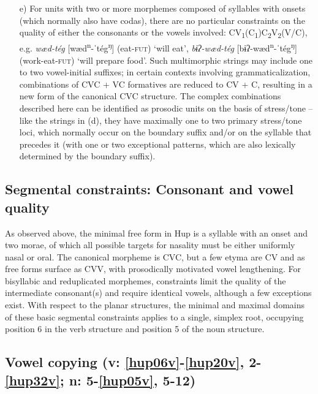 \documentclass[output=paper]{langscibook}
\begin{document}
\begin{enumerate}
    \item[e)] For units with two or more morphemes composed of syllables with onsets (which normally also have codas), there are no particular constraints on the quality of either the consonants or the vowels involved: CV\textsubscript{1}(C\textsubscript{1})C\textsubscript{2}V\textsubscript{2}(V/C), e.g. \textit{wæd-tég} [wæd\textsuperscript{n}{}-ˈtég\textsuperscript{ŋ}] (eat-\textsc{fut)} `will eat', \textit{bɨʔ-wæd-tég} [bɨʔ-wæd\textsuperscript{n}{}-ˈtég\textsuperscript{ŋ}] (work-eat-\textsc{fut}) `will prepare food'. Such multimorphic strings may include one to two vowel-initial suffixes; in certain contexts involving grammaticalization, combinations of CVC + VC formatives are reduced to CV + C, resulting in a new form of the canonical CVC structure. The complex combinations described here can be identified as prosodic units on the basis of stress/tone – like the strings in (d), they have maximally one to two primary stress/tone loci, which normally occur on the boundary suffix and/or on the syllable that precedes it (with one or two exceptional patterns, which are also lexically determined by the boundary suffix).
\end{enumerate}

\subsection{Segmental constraints: Consonant and vowel quality} \label{sec:hup:key:5.2}

As observed above, the minimal free form in Hup is a syllable with an onset and two morae, of which all possible targets for nasality must be either uniformly nasal or oral. The canonical morpheme is CVC, but a few etyma are CV and as free forms surface as CVV, with prosodically motivated vowel lengthening. For bisyllabic and reduplicated morphemes, constraints limit the quality of the intermediate consonant(s) and require identical vowels, although a few exceptions exist. With respect to the planar structures, the minimal and maximal domains of these basic segmental constraints applies to a single, simplex root, occupying position 6 in the verb structure and position 5 of the noun structure.

\subsection{Vowel copying (v: \ref{hup06v}-\ref{hup20v}, 2-\ref{hup32v}; n: 5-\ref{hup05v}, 5-12)} 
\label{sec:hup:key:5.3}
\end{document}
